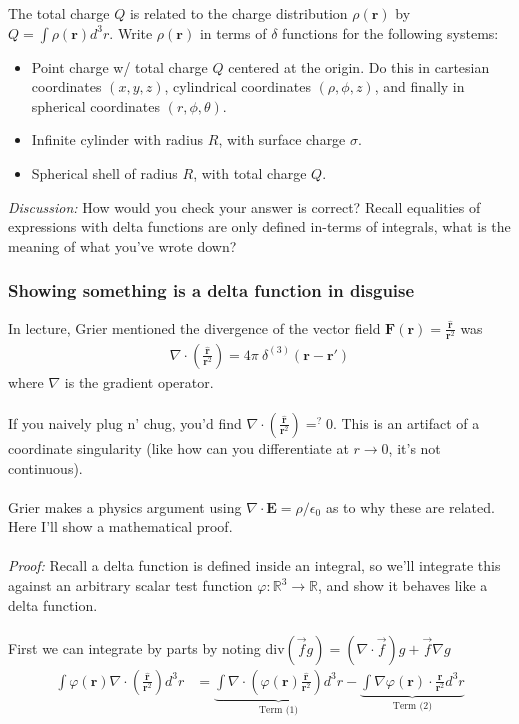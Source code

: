 \documentclass[12pt,fleqn]{article}
\numberwithin{equation}{section} %
\newcounter{problem}
\newcounter{answer}
\begin{document}
\begin{problem}
	The total charge $Q$ is related to the charge distribution $\rho(\mathbf r)$ by $Q = \int \rho(\mathbf r) d^3 r$. Write 
$\rho(\mathbf r)$ in terms of $\delta$ functions for the following systems:
	\begin{itemize}
		\item Point charge w/ total charge $Q$ centered at the origin. Do this in cartesian coordinates $(x,y,z)$, cylindrical coordinates $(\rho, \phi, z)$, and finally in spherical coordinates $(r, \phi, \theta)$.
		\item Infinite cylinder with radius $R$, with surface charge $\sigma$.
		\item Spherical shell of radius $R$, with total charge $Q$. 
	\end{itemize}
	\emph{Discussion:} How would you check your answer is correct? Recall equalities of expressions with delta functions are only defined in-terms of integrals, what is the meaning of what you've wrote down?
\end{problem}

\subsubsection{Showing something is a delta function in disguise}
In lecture, Grier mentioned the divergence of the vector field $\mathbf F(\mathbf r) = \frac{\mathbf{\hat{r}}}{\mathbf r^2}$ was
\begin{align}
	\boxed{\nabla \cdot \left ( \frac{\mathbf{\hat{r}}}{\mathbf r^2}\right) = 4\pi ~\delta^{(3)} (\mathbf r - \mathbf r')}
\end{align}
where $\nabla$ is the gradient operator.\\
\\
If you naively plug n' chug, you'd find $\nabla \cdot \left ( \frac{\mathbf{\hat{r}}}{\mathbf r^2}\right) =^? 0$. This is an artifact of a coordinate singularity (like how can you differentiate at $r \to 0$, it's not continuous). \\
\\
Grier makes a physics argument using $\nabla \cdot \mathbf E =  \rho / \epsilon_0$ as to why these are related. Here I'll show a mathematical proof.
\\
\\
\emph{Proof:} Recall a delta function is defined inside an integral, so we'll integrate this against an arbitrary scalar test function $\varphi : \mathbb R^3 \to \mathbb R$, and show it behaves like a delta function.\\
\\
First we can integrate by parts by noting $\text{div}(\vec f g) = (\nabla \cdot \vec f) g + \vec f \nabla g$
\begin{align}
	\int \varphi(\mathbf r) \nabla \cdot \left( \frac{\mathbf{\hat{r}}}{\mathbf r^2} \right) d^3 r & = \underbrace{\int \nabla\cdot (\varphi(\mathbf r) \frac{\mathbf{\hat{r}}}{\mathbf r^2}) d^3r}_{\text{Term (1)}} - \underbrace{\int \nabla\varphi(\mathbf r) \cdot \frac{\mathbf{\hat{r}}}{\mathbf r^2} d^3r}_{\text{Term (2)}}
\end{align}
\end{document}
